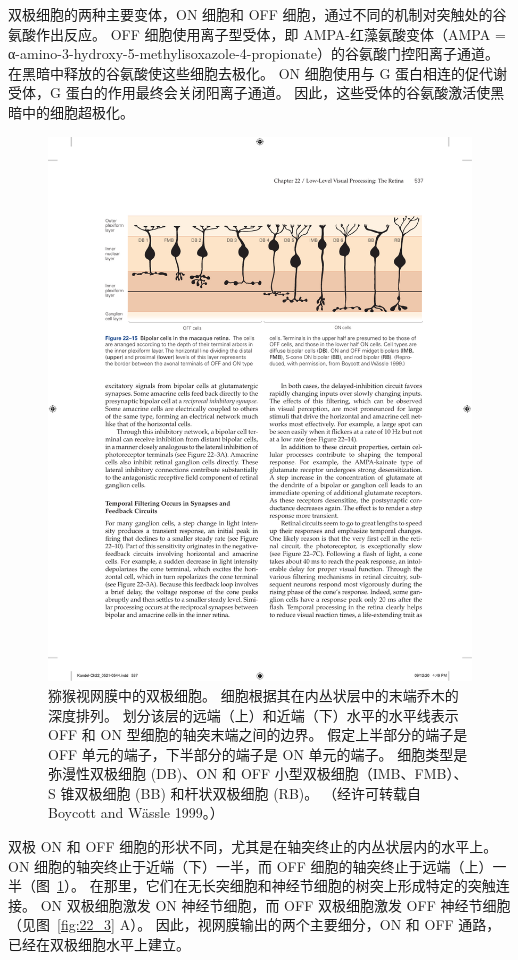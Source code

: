 双极细胞的两种主要变体，ON 细胞和 OFF 细胞，通过不同的机制对突触处的谷氨酸作出反应。
OFF 细胞使用离子型受体，即 AMPA-红藻氨酸变体（AMPA = α-amino-3-hydroxy-5-methylisoxazole-4-propionate）的谷氨酸门控阳离子通道。
在黑暗中释放的谷氨酸使这些细胞去极化。
ON 细胞使用与 G 蛋白相连的促代谢受体，G 蛋白的作用最终会关闭阳离子通道。
因此，这些受体的谷氨酸激活使黑暗中的细胞超极化。


\begin{figure}[htbp]
	\centering
	\includegraphics[width=1.0\linewidth]{chap22/fig_22_15}
	\caption{猕猴视网膜中的双极细胞。 
		细胞根据其在内丛状层中的末端乔木的深度排列。 
		划分该层的远端（上）和近端（下）水平的水平线表示 OFF 和 ON 型细胞的轴突末端之间的边界。 
		假定上半部分的端子是 OFF 单元的端子，下半部分的端子是 ON 单元的端子。 
		细胞类型是弥漫性双极细胞 (DB)、ON 和 OFF 小型双极细胞（IMB、FMB）、S 锥双极细胞 (BB) 和杆状双极细胞 (RB)。 （经许可转载自 Boycott and Wässle 1999。）}
	\label{fig:22_15}
\end{figure}


双极 ON 和 OFF 细胞的形状不同，尤其是在轴突终止的内丛状层内的水平上。
ON 细胞的轴突终止于近端（下）一半，而 OFF 细胞的轴突终止于远端（上）一半（图~\ref{fig:22_15}）。
在那里，它们在无长突细胞和神经节细胞的树突上形成特定的突触连接。
ON 双极细胞激发 ON 神经节细胞，而 OFF 双极细胞激发 OFF 神经节细胞（见图~\ref{fig:22_3} A）。
因此，视网膜输出的两个主要细分，ON 和 OFF 通路，已经在双极细胞水平上建立。


